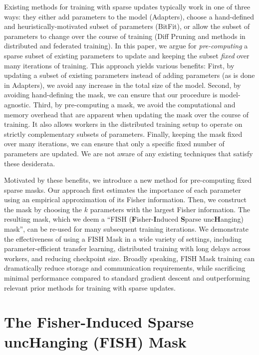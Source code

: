 Existing methods for training with sparse updates typically work in one of three ways: they either add parameters to the model (Adapters), choose a hand-defined and heuristically-motivated subset of parameters (BitFit), or allow the subset of parameters to change over the course of training (Diff Pruning and methods in distributed and federated training). In this paper, we argue for \textit{pre-computing} a sparse subset of existing parameters to update and keeping the subset \textit{fixed} over many iterations of training. This approach yields various benefits: First, by updating a subset of existing parameters instead of adding parameters (as is done in Adapters), we avoid any increase in the total size of the model. Second, by avoiding hand-defining the mask, we can ensure that our procedure is model-agnostic. Third, by pre-computing a mask, we avoid the computational and memory overhead that are apparent when updating the mask over the course of training. It also allows workers in the distributed training setup to operate on strictly complementary subsets of parameters. Finally, keeping the mask fixed over many iterations, we can ensure that only a specific fixed number of parameters are updated. We are not aware of any existing techniques that satisfy these desiderata.

Motivated by these benefits, we introduce a new method for pre-computing fixed sparse masks. Our approach first estimates the importance of each parameter using an empirical approximation of its Fisher information. Then, we construct the mask by choosing the $k$ parameters with the largest Fisher information. The resulting mask, which we deem a ``FISH (\textbf{F}isher-\textbf{I}nduced \textbf{S}parse unc\textbf{H}anging) mask'', can be re-used for many subsequent training iterations. We demonstrate the effectiveness of using a FISH Mask in a wide variety of settings, including parameter-efficient transfer learning, distributed training with long delays across workers, and reducing checkpoint size. Broadly speaking, FISH Mask training can dramatically reduce storage and communication requirements, while sacrificing minimal performance compared to standard gradient descent and outperforming relevant prior methods for training with sparse updates.

\section{The Fisher-Induced Sparse uncHanging (FISH) Mask}
\label{sec:fish}

